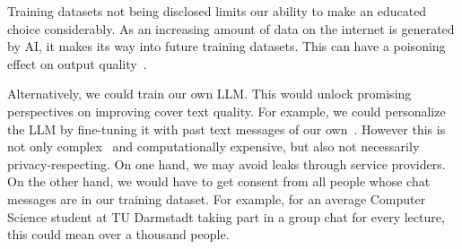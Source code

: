 Training datasets not being disclosed limits our ability to make an educated choice considerably. As an increasing amount of data on the internet is generated by \gls{AI}, it makes its way into future training datasets. This can have a poisoning effect on output quality~\cite{alemohammadSelfConsumingGenerativeModels2023,shumailovCurseRecursionTraining2024,martinezUnderstandingInterplayGenerative2023,martinezCombiningGenerativeArtificial2023}.

Alternatively, we could train our own \gls{LLM}. This would unlock promising perspectives on improving cover text quality. For example, we could personalize the \gls{LLM} by fine-tuning it with past text messages of our own~\cite{donnerSimulationMeFinetuning2024,donnerStepStepGuide2024,donnerFinetuningLLMYour2024,donnerFinetuningLLMYour2024a,donnerFinetuningLLMYour2024b}. However this is not only complex~\cite{huLoRALowRankAdaptation2021} and computationally expensive, but also not necessarily privacy-respecting. On one hand, we may avoid leaks through service providers. On the other hand, we would have to get consent from all people whose chat messages are in our training dataset. For example, for an average Computer Science student at TU Darmstadt taking part in a group chat for every lecture, this could mean over a thousand people.

